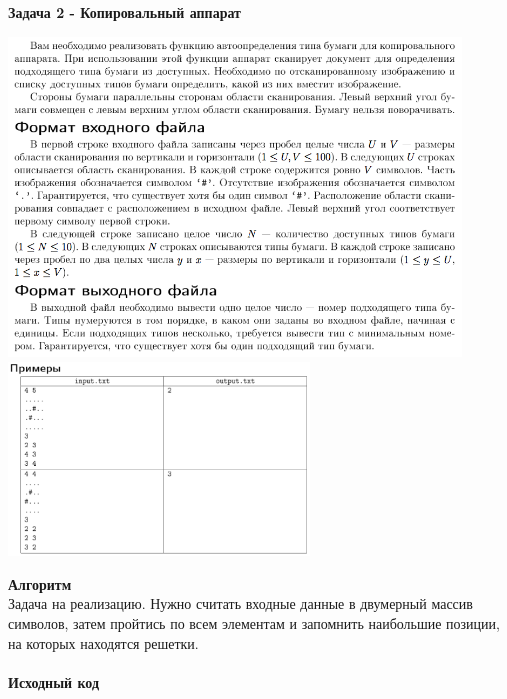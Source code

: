 \documentclass[a4paper,12pt]{article}
\begin{document}
\textbf{{\large Задача 2 - Копировальный аппарат}} \\
\begin{center}
\includegraphics[width=0.9\textwidth]{Siberia/Siberia_1.png}\\ [1cm]
\includegraphics[width=0.6\textwidth]{Siberia/Siberia_2.png}\\ [1cm]
\end{center}
\textbf{{\large Алгоритм}} \\
Задача на реализацию. Нужно считать входные данные в двумерный массив символов, затем пройтись по всем элементам и запомнить наибольшие позиции, на которых находятся решетки. \\ \\
\textbf{{\large Исходный код}}
\end{document}
